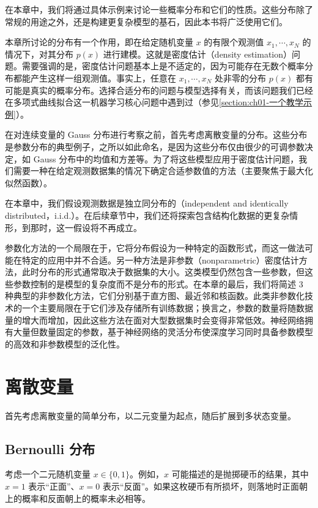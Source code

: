 \documentclass[../../main.tex]{subfiles}
\begin{document}
在本章中，我们将通过具体示例来讨论一些概率分布和它们的性质。这些分布除了常规的用途之外，还是构建更复杂模型的基石，因此本书将广泛使用它们。

本章所讨论的分布有一个作用，即在给定随机变量 $x$ 的有限个观测值 $x_1,\cdots,x_N$ 的情况下，对其分布 $p(x)$ 进行建模。这就是密度估计（density estimation）问题。需要强调的是，密度估计问题基本上是不适定的，因为可能存在无数个概率分布都能产生这样一组观测值。事实上，任意在 $x_1,\cdots,x_N$ 处非零的分布 $p(x)$ 都有可能是真实的概率分布。选择合适分布的问题与模型选择有关，而该问题我们已经在多项式曲线拟合这一机器学习核心问题中遇到过（参见\cref{section:ch01-一个教学示例}）。

在对连续变量的 Gauss 分布进行考察之前，首先考虑离散变量的分布。这些分布是参数分布的典型例子，之所以如此命名，是因为这些分布仅由很少的可调参数决定，如 Gauss 分布中的均值和方差等。为了将这些模型应用于密度估计问题，我们需要一种在给定观测数据集的情况下确定合适参数值的方法（主要聚焦于最大化似然函数）。

在本章中，我们假设观测数据是独立同分布的（independent and identically distributed，i.i.d.）。在后续章节中，我们还将探索包含结构化数据的更复杂情形，到那时，这一假设将不再成立。

参数化方法的一个局限在于，它将分布假设为一种特定的函数形式，而这一做法可能在特定的应用中并不合适。另一种方法是非参数（nonparametric）密度估计方法，此时分布的形式通常取决于数据集的大小。这类模型仍然包含一些参数，但这些参数控制的是模型的复杂度而不是分布的形式。在本章的最后，我们将简述 3 种典型的非参数化方法，它们分别基于直方图、最近邻和核函数。此类非参数化技术的一个主要局限在于它们涉及存储所有训练数据；换言之，参数的数量将随数据量的增大而增加，因此这些方法在面对大型数据集时会变得非常低效。神经网络拥有大量但数量固定的参数，基于神经网络的灵活分布使深度学习同时具备参数模型的高效和非参数模型的泛化性。

\section{离散变量}\label{section:ch03-离散变量}

首先考虑离散变量的简单分布，以二元变量为起点，随后扩展到多状态变量。

\subsection{Bernoulli 分布}\label{subsection:ch03-Bernoulli分布}

考虑一个二元随机变量 $x\in\{0,1\}$。例如，$x$ 可能描述的是抛掷硬币的结果，其中 $x=1$ 表示“正面”、$x=0$ 表示“反面”。如果这枚硬币有所损坏，则落地时正面朝上的概率和反面朝上的概率未必相等。
\end{document}
